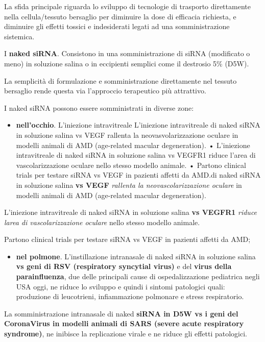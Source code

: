 \documentclass[11pt]{book}
\begin{document}
La sfida principale riguarda lo sviluppo di tecnologie di trasporto
direttamente nella cellula/tessuto bersaglio per diminuire la dose di
efficacia richiesta, e diminuire gli effetti tossici e indesiderati
legati ad una somministrazione sistemica.

I \textbf{naked siRNA}. Consistono in una somministrazione di siRNA
(modificato o meno) in soluzione salina o in eccipienti semplici come il
destrosio 5\% (D5W).

La semplicità di formulazione e somministrazione direttamente nel
tessuto bersaglio rende questa via l'approccio terapeutico più
attrattivo.

I naked siRNA possono essere somministrati in diverse zone:

\begin{itemize}
\itemsep1pt\parskip0pt
\item
  \textbf{nell'occhio}. L'iniezione intravitreale L'iniezione
  intravitreale di naked siRNA in soluzione salina vs VEGF rallenta la
  neovasvolarizzazione oculare in modelli animali di AMD (age-related
  macular degeneration). • L'iniezione intravitreale di naked siRNA in
  soluzione salina vs VEGFR1 riduce l'area di vascolarizzazione oculare
  nello stesso modello animale. • Partono clinical trials per testare
  siRNA vs VEGF in pazienti affetti da AMD.di naked siRNA in soluzione
  salina \textbf{vs VEGF} \emph{rallenta la neovascolarizzazione
  oculare} in modelli animali di AMD (age-related macular degeneration).
\end{itemize}

L'iniezione intravitreale di naked siRNA in soluzione salina \textbf{vs
VEGFR1} \emph{riduce larea di vascolarizzazione oculare} nello stesso
modello animale.

Partono clinical trials per testare siRNA vs VEGF in pazienti affetti da
AMD;

\begin{itemize}
\itemsep1pt\parskip0pt
\item
  \textbf{nel polmone}. L'instillazione intranasale di naked siRNA in
  soluzione salina \textbf{vs geni di RSV (respiratory syncytial virus)}
  e del \textbf{virus della parainfluenza}, due delle principali cause
  di ospedalizzazione pediatrica negli USA oggi, ne riduce lo sviluppo e
  quindi i sintomi patologici quali: produzione di leucotrieni,
  infiammazione polmonare e stress respiratorio.
\end{itemize}

La somministrazione intranasale di naked \textbf{siRNA in D5W vs i geni
del CoronaVirus in modelli animali di SARS (severe acute respiratory
syndrome)}, ne inibisce la replicazione virale e ne riduce gli effetti
patologici.
\end{document}
